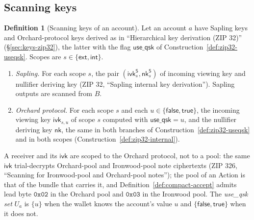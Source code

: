 \documentclass[11pt,a4paper]{article}
\theoremstyle{definition}
\newtheorem{definition}[theorem]{Definition}
\newcommand{\nksym}{\ensuremath{\mathsf{nk}}}
\newcommand{\ivk}{\ensuremath{\mathsf{ivk}}}
\begin{document}
\subsection{Scanning keys}\label{sec:scan-keys}

\begin{definition}[Scanning keys of an account]\label{def:scan-keys}
Let an account $a$ have Sapling keys and Orchard-protocol keys derived as in
``Hierarchical key derivation (ZIP 32)'' (\S\ref{sec:keys-zip32}), the
latter with the flag $\mathsf{use\_qsk}$ of
Construction~\ref{def:zip32-useqsk}. Scopes are
$s \in \{\mathsf{ext}, \mathsf{int}\}$.
\begin{enumerate}[label=(\roman*)]
\item \emph{Sapling.} For each scope $s$, the pair
  $(\ivk^{\mathsf{S}}_s, \nksym^{\mathsf{S}}_s)$ of incoming viewing key and
  nullifier deriving key (ZIP 32, ``Sapling internal key derivation'').
  Sapling outputs are scanned from $B$.
\item \emph{Orchard protocol.} For each scope $s$ and each
  $u \in \{\mathsf{false}, \mathsf{true}\}$, the incoming viewing key
  $\ivk_{s,u}$ of scope $s$ computed with $\mathsf{use\_qsk} = u$, and the
  nullifier deriving key $\nksym$, the same in both branches of
  Construction~\ref{def:zip32-useqsk} and in both scopes
  (Construction~\ref{def:zip32-internal}).
\end{enumerate}
A receiver and its $\ivk$ are scoped to the Orchard protocol, not to a
pool: the same $\ivk$ trial-decrypts Orchard-pool and Ironwood-pool note
ciphertexts (ZIP 326, ``Scanning for Ironwood-pool and Orchard-pool
notes''); the pool of an Action is that of the bundle that carries it, and
Definition~\ref{def:compact-accept} admits lead byte $\mathtt{0x02}$ in the
Orchard pool and $\mathtt{0x03}$ in the Ironwood pool. The \emph{use\_qsk set}
$U_a$ is $\{u\}$ when the wallet knows the account's value $u$ and
$\{\mathsf{false}, \mathsf{true}\}$ when it does not.


\end{definition}
\end{document}
